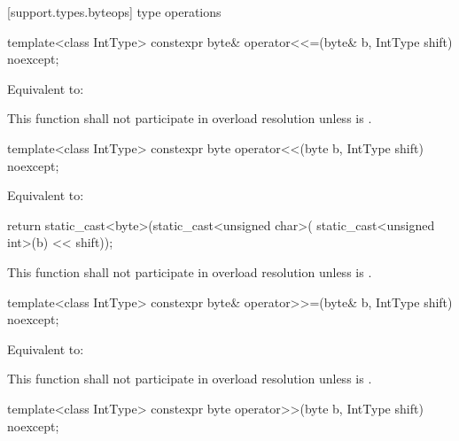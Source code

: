 
[support.types.byteops]{ type operations}

%
\begin{itemdecl}
template<class IntType>
  constexpr byte& operator<<=(byte& b, IntType shift) noexcept;
\end{itemdecl}

\begin{itemdescr}
\pnum \effects Equivalent to:

\pnum \remarks This function shall not participate in overload resolution unless
 is .
\end{itemdescr}

%
\begin{itemdecl}
template<class IntType>
  constexpr byte operator<<(byte b, IntType shift) noexcept;
\end{itemdecl}

\begin{itemdescr}
\pnum \effects Equivalent to:
\begin{codeblock}
return static_cast<byte>(static_cast<unsigned char>(
	                   static_cast<unsigned int>(b) << shift));
\end{codeblock}

\pnum \remarks This function shall not participate in overload resolution unless
 is .
\end{itemdescr}

%
\begin{itemdecl}
template<class IntType>
  constexpr byte& operator>>=(byte& b, IntType shift) noexcept;
\end{itemdecl}

\begin{itemdescr}
\pnum \effects Equivalent to:

\pnum \remarks This function shall not participate in overload resolution unless
 is .
\end{itemdescr}

%
\begin{itemdecl}
template<class IntType>
  constexpr byte operator>>(byte b, IntType shift) noexcept;
\end{itemdecl}

